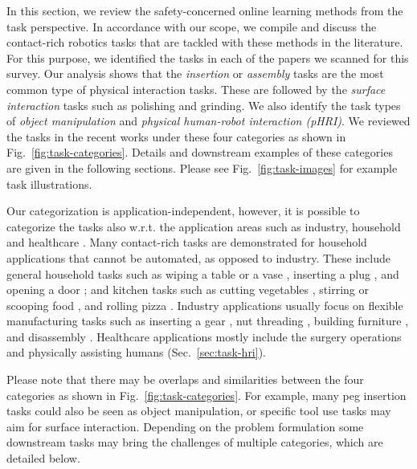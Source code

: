 \documentclass[Afour,sageh,times]{template/sagej}
\begin{document}
In this section, we review the safety-concerned online learning methods from the task perspective. 
In accordance with our scope, we compile and discuss the contact-rich robotics tasks that are tackled with these methods in the literature. 
For this purpose, we identified the tasks in each of the papers we scanned for this survey. 
Our analysis shows that the \textit{insertion} or \textit{assembly} tasks are the most common type of physical interaction tasks. These are followed by the \textit{surface interaction} tasks such as polishing and grinding. 
We also identify the task types of \textit{object manipulation} and \textit{physical human-robot interaction (pHRI)}. 
We reviewed the tasks in the recent works under these four categories as shown in Fig.~\ref{fig:task-categories}. Details and downstream examples of these categories are given in the following sections. Please see Fig.~\ref{fig:task-images} for example task illustrations.

Our categorization is application-independent, however, it is possible to categorize the tasks also w.r.t. the application areas such as industry, household and healthcare \citep{Tsuji2025asu}.
Many contact-rich tasks are demonstrated for household applications that cannot be automated, as opposed to industry. These include general household tasks such as wiping a table or a vase \citep{151,6}, inserting a plug \citep{112,146}, and opening a door \citep{36,149}; and kitchen tasks such as cutting vegetables \citep{21, 157}, stirring or scooping food \citep{92,191}, and rolling pizza \citep{156}.
Industry applications usually focus on flexible manufacturing tasks such as inserting a gear \citep{177,192}, nut threading \citep{10}, building furniture \citep{43}, and disassembly \citep{20,62}. 
Healthcare applications mostly include the surgery operations \citep{339,188} and physically assisting humans (Sec.~\ref{sec:task-hri}). 

Please note that there may be overlaps and similarities between the four categories as shown in Fig.~\ref{fig:task-categories}. 
For example, many peg insertion tasks could also be seen as object manipulation, or specific tool use tasks may aim for surface interaction. 
Depending on the problem formulation some downstream tasks may bring the challenges of multiple categories, which are detailed below.
\end{document}
